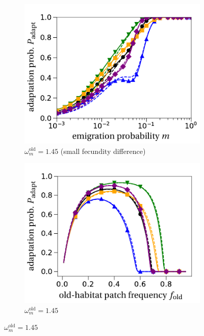 \documentclass[a4paper,11pt]{article}
\begin{document}
\begin{figure}[t!]
\begin{subfigure}{.5\textwidth}
 		 \centering
 		 \includegraphics[width=\linewidth]{fig3c.pdf}
  		\caption{$\omega^\text{old}_m=1.45$  (small fecundity difference)}
	\end{subfigure}%
	\begin{subfigure}{.5\textwidth}
  		\centering
  		\includegraphics[width=\linewidth]{fig3d.pdf}
  		\caption{$\omega^\text{old}_m=1.45$}
	\end{subfigure}

\end{figure}
\end{document}
